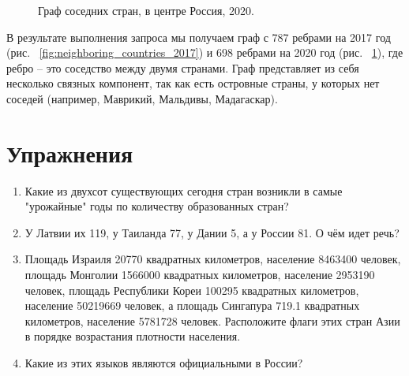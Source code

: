 \begin{figure}
	{
		\setlength{\fboxsep}{0pt}%
		\setlength{\fboxrule}{1pt}%
	}
	\caption{Граф соседних стран, в центре Россия, 2020.
	}%
	\label{fig:neighboring_countries_2020}%
\end{figure}

В результате выполнения запроса мы получаем граф с 787 ребрами на 2017 год (рис. ~\ref{fig:neighboring_countries_2017}) и 698 ребрами на 2020 год (рис. ~\ref{fig:neighboring_countries_2020}), где ребро – это соседство между двумя странами. Граф представляет из себя несколько связных компонент, так как есть островные страны, у которых нет соседей (например, Маврикий, Мальдивы, Мадагаскар).

\section{Упражнения}

\begin{enumerate}
	\item Какие из двухсот существующих сегодня стран возникли в самые "урожайные" годы по количеству образованных стран?
	\item У Латвии их 119, у Таиланда 77, у Дании 5, а у России 81. О чём идет речь?
	\item Площадь Израиля 20770 квадратных километров, население 8463400 человек, площадь Монголии 1566000 квадратных километров, население 2953190 человек, площадь Республики Кореи 100295 квадратных километров, население 50219669 человек, а площадь Сингапура 719.1 квадратных километров, население 5781728 человек.
	Расположите флаги этих стран Азии в порядке возрастания плотности населения.
	\item Какие из этих языков являются официальными в России?
\end{enumerate}